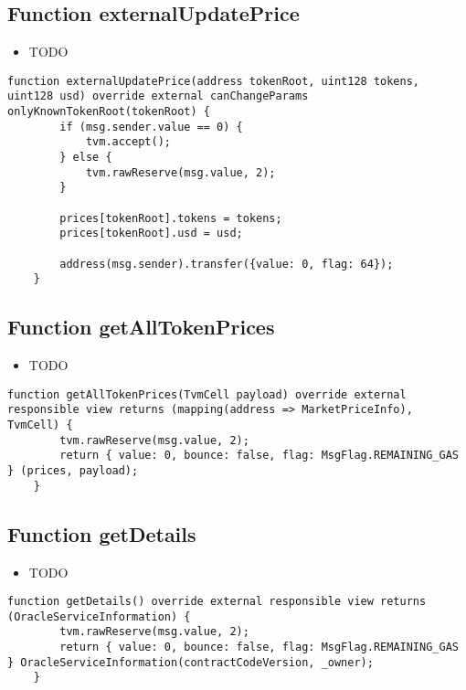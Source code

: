 \subsection{Function externalUpdatePrice}

\noindent\begin{itemize}
\item TODO
\end{itemize}

\begin{lstlisting}[firstnumber=117]
    function externalUpdatePrice(address tokenRoot, uint128 tokens, uint128 usd) override external canChangeParams onlyKnownTokenRoot(tokenRoot) {
        if (msg.sender.value == 0) {
            tvm.accept();
        } else {
            tvm.rawReserve(msg.value, 2);
        }

        prices[tokenRoot].tokens = tokens;
        prices[tokenRoot].usd = usd;

        address(msg.sender).transfer({value: 0, flag: 64});
    }
\end{lstlisting}

\subsection{Function getAllTokenPrices}

\noindent\begin{itemize}
\item TODO
\end{itemize}

\begin{lstlisting}[firstnumber=167]
    function getAllTokenPrices(TvmCell payload) override external responsible view returns (mapping(address => MarketPriceInfo), TvmCell) {
        tvm.rawReserve(msg.value, 2);
        return { value: 0, bounce: false, flag: MsgFlag.REMAINING_GAS } (prices, payload);
    }
\end{lstlisting}

\subsection{Function getDetails}

\noindent\begin{itemize}
\item TODO
\end{itemize}

\begin{lstlisting}[firstnumber=104]
    function getDetails() override external responsible view returns (OracleServiceInformation) {
        tvm.rawReserve(msg.value, 2);
        return { value: 0, bounce: false, flag: MsgFlag.REMAINING_GAS } OracleServiceInformation(contractCodeVersion, _owner);
    }
\end{lstlisting}

